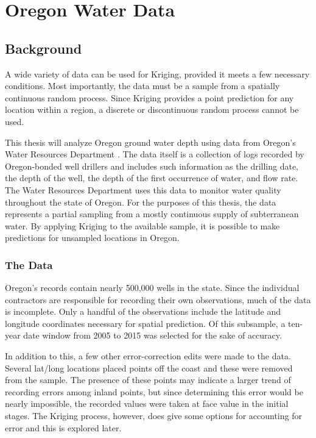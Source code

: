 \documentclass[12pt,twoside]{reedthesis}
\begin{document}
\chapter{Oregon Water Data}

\section{Background}
A wide variety of data can be used for Kriging, provided it meets a few necessary conditions. Most importantly, the data must be a sample from a spatially continuous random process. Since Kriging provides a point prediction for any location within a region, a discrete or discontinuous random process cannot be used. 

This thesis will analyze Oregon ground water depth using data from Oregon's Water Resources Department \cite{groundwater}. The data itself is a collection of logs recorded by Oregon-bonded well drillers and includes such information as the drilling date, the depth of the well, the depth of the first occurrence of water, and flow rate. The Water Resources Department uses this data to monitor water quality throughout the state of Oregon. For the purposes of this thesis, the data represents a partial sampling from a mostly continuous supply of subterranean water. By applying Kriging to the available sample, it is possible to make predictions for unsampled locations in Oregon. 


\subsection{The Data}

Oregon's records contain nearly 500,000 wells in the state. Since the individual contractors are responsible for recording their own observations, much of the data is incomplete. Only a handful of the observations include the latitude and longitude coordinates necessary for spatial prediction. Of this subsample, a ten-year date window from 2005 to 2015 was selected for the sake of accuracy. 

In addition to this, a few other error-correction edits were made to the data. Several lat/long locations placed points off the coast and these were removed from the sample. The presence of these points may indicate a larger trend of recording errors among inland points, but since determining this error would be nearly impossible, the recorded values were taken at face value in the initial stages. The Kriging process, however, does give some options for accounting for error and this is explored later. 
\end{document}
